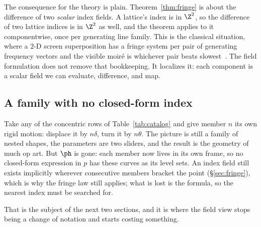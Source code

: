 The consequence for the theory is plain. Theorem~\ref{thm:fringe}
is about the difference of two \emph{scalar} index fields. A lattice's index is in
$\Z^2$, so the difference of two lattice indices is in $\Z^2$ as well, and the
theorem applies to it componentwise, once per generating line family. This is
the classical situation, where a $2$-D screen superposition has a fringe
system per pair of generating frequency vectors and the visible moir\'e is whichever
pair beats slowest~\cite{Amidror2009Theory, Amidror1998Fourier}. The field
formulation does not remove that bookkeeping. It localizes it: each component is a
scalar field we can evaluate, difference, and map.

\subsection{A family with no closed-form index}

Take any of the concentric rows of Table~\ref{tab:catalog} and give member $n$ its
own rigid motion: displace it by $n\delta$, turn it by $n\theta$. The picture is
still a family of nested shapes, the parameters are two sliders, and the result is
the geometry of much op art. But $\ph$ is gone: each member now lives in
its own frame, so no closed-form expression in $p$ has these curves as its level
sets. An index field still exists implicitly wherever consecutive members bracket
the point (\S\ref{sec:fringe}), which is why the fringe law still applies; what is
lost is the formula, so the nearest index must be searched for.

That is the subject of the next two sections, and it is where the field view stops
being a change of notation and starts costing something.
